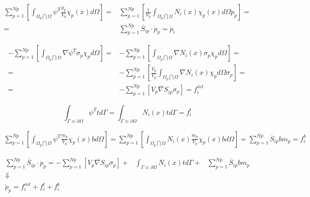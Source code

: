 \begin{eqnarray}  
  \sum^{Np}_{p=1} \left[ \int_{\Omega_p \bigcap \Omega}
  \psi^T\frac{\dot{p}_p}{V_p}\chi_p(x) d\Omega \right] =& \sum^{Np}_{p=1}\left[ \frac{1}{V_p}\int_{\Omega_p \bigcap \Omega} N_i(x) \chi_p(x) d\Omega \dot{p}_p  \right] = \nonumber \\
  =& \sum_{p=1}^{Np} \overline{S}_{ip}\cdot \dot{p}_p = \dot{p}_i
\end{eqnarray}

\begin{eqnarray}
  -\sum^{Np}_{p=1}\left[ \int_{\Omega_p \bigcap \Omega}\nabla\psi^T \sigma_p \chi_p  d\Omega \right] =& -\sum^{Np}_{p=1}\left[ \int_{\Omega_p \bigcap \Omega}\nabla N_i(x) \sigma_p \chi_p  d\Omega \right] = \nonumber \\
  =& - \sum^{Np}_{p=1}\left[ \frac{V_p}{V_p} \int_{\Omega_p \bigcap \Omega}\nabla N_i(x) \chi_p  d\Omega \sigma_p \right] = \nonumber \\
  =& - \sum^{Np}_{p=1}\left[V_p\overline{\nabla S}_{ip} \sigma_p \right] = f_i^{int}
\end{eqnarray}

\begin{equation}
  \int_{\Gamma \equiv \partial \Omega} \psi^T t d\Gamma = \int_{\Gamma \equiv \partial \Omega} N_i(x) t d\Gamma = f_i^t
\end{equation}

\begin{eqnarray}
  \sum_{p=1}^{Np} \left[ \int_{\Omega_p \bigcap \Omega} \psi^T \frac{m_p}{V_p} \chi_p(x) b d\Omega \right] = \sum_{p=1}^{Np} \left[ \int_{\Omega_p \bigcap \Omega} N_i(x)  \frac{m_p}{V_p} \chi_p(x) b d\Omega  \right] =  \sum_{p=1}^{Np} \overline{S}_{ip}b m_p = f_i^b  
\end{eqnarray}


\begin{eqnarray}
  \sum_{p=1}^{Np} \overline{S}_{ip}\cdot \dot{p}_p  =
  -\sum^{Np}_{p=1}\left[V_p\overline{\nabla S}_{ip} \sigma_p \right]
  +&  \int_{\Gamma \equiv \partial \Omega} N_i(x) t d\Gamma \nonumber
     +& \sum_{p=1}^{Np} \overline{S}_{ip}b m_p \nonumber\\
  \Downarrow&  \\
  \dot{p}_p = f_i^{int} + f_i^t + f_i^b \nonumber
\end{eqnarray}

